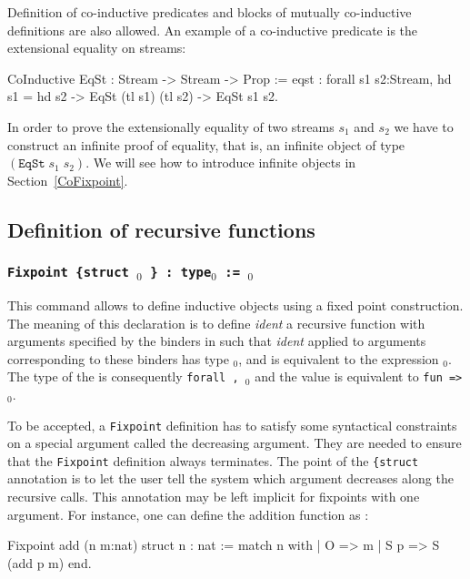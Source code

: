 Definition of co-inductive predicates and blocks of mutually
co-inductive definitions are also allowed. An example of a
co-inductive predicate is the extensional equality on streams:

\begin{coq_example}
CoInductive EqSt : Stream -> Stream -> Prop :=
    eqst :
      forall s1 s2:Stream,
        hd s1 = hd s2 -> EqSt (tl s1) (tl s2) -> EqSt s1 s2.
\end{coq_example}

In order to prove the extensionally equality of two streams $s_1$ and
$s_2$ we have to construct an infinite proof of equality, that is,
an infinite object of type $(\texttt{EqSt}\;s_1\;s_2)$. We will see
how to introduce infinite objects in Section~\ref{CoFixpoint}.

\subsection{Definition of recursive functions}

\subsubsection{\tt Fixpoint {\ident} {\params} {\tt \{struct}
  \ident$_0$ {\tt \}} : type$_0$ := \term$_0$ 
\label{Fixpoint}}

This command allows to define inductive objects using a fixed point
construction. The meaning of this declaration is to define {\it ident}
a recursive function with arguments specified by the binders in
\params{} %
such that {\it ident} applied to
arguments corresponding to these binders has type \type$_0$, and is
equivalent to the expression \term$_0$. The type of the {\ident} is
consequently {\tt forall {\params} {\tt,} \type$_0$}
and the value is equivalent to {\tt fun {\params} {\tt =>} \term$_0$}.

To be accepted, a {\tt Fixpoint} definition has to satisfy some
syntactical constraints on a special argument called the decreasing
argument. They are needed to ensure that the {\tt Fixpoint} definition
always terminates. The point of the {\tt \{struct \ident {\tt \}}}
annotation is to let the user tell the system which argument decreases
along the recursive calls. This annotation may be left implicit for
fixpoints with one argument. For instance, one can define the addition
function as :

\begin{coq_example}
Fixpoint add (n m:nat) {struct n} : nat :=
  match n with
  | O => m
  | S p => S (add p m)
  end.
\end{coq_example}

